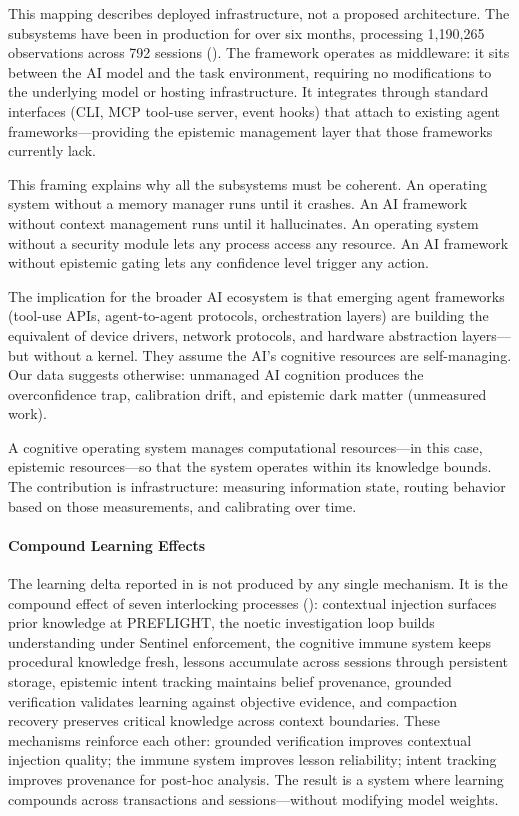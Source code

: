 This mapping describes deployed infrastructure, not a proposed architecture. The subsystems have been in production for over six months, processing 1,190,265 observations across 792 sessions (). The framework operates as middleware: it sits between the AI model and the task environment, requiring no modifications to the underlying model or hosting infrastructure. It integrates through standard interfaces (CLI, MCP tool-use server, event hooks) that attach to existing agent frameworks---providing the epistemic management layer that those frameworks currently lack.

This framing explains why all the subsystems must be coherent. An operating system without a memory manager runs until it crashes. An AI framework without context management runs until it hallucinates. An operating system without a security module lets any process access any resource. An AI framework without epistemic gating lets any confidence level trigger any action.

The implication for the broader AI ecosystem is that emerging agent frameworks (tool-use APIs, agent-to-agent protocols, orchestration layers) are building the equivalent of device drivers, network protocols, and hardware abstraction layers---but without a kernel. They assume the AI's cognitive resources are self-managing. Our data suggests otherwise: unmanaged AI cognition produces the overconfidence trap, calibration drift, and epistemic dark matter (unmeasured work).

A cognitive operating system manages computational resources---in this case, epistemic resources---so that the system operates within its knowledge bounds. The contribution is infrastructure: measuring information state, routing behavior based on those measurements, and calibrating over time.

\paragraph{Compound Learning Effects}

The learning delta reported in  is not produced by any single mechanism. It is the compound effect of seven interlocking processes (): contextual injection surfaces prior knowledge at PREFLIGHT, the noetic investigation loop builds understanding under Sentinel enforcement, the cognitive immune system keeps procedural knowledge fresh, lessons accumulate across sessions through persistent storage, epistemic intent tracking maintains belief provenance, grounded verification validates learning against objective evidence, and compaction recovery preserves critical knowledge across context boundaries. These mechanisms reinforce each other: grounded verification improves contextual injection quality; the immune system improves lesson reliability; intent tracking improves provenance for post-hoc analysis. The result is a system where learning compounds across transactions and sessions---without modifying model weights.

